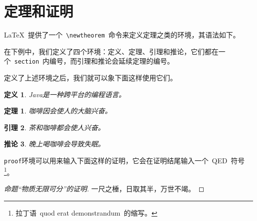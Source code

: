 \section{定理和证明}
\LaTeX~提供了一个~\verb|\newtheorem|~命令来定义定理之类的环境，其语法如下。
\begin{code}
\newtheorem{环境名}[编号延续]{显示名}[编号层次]
\end{code}

在下例中，我们定义了四个环境：定义、定理、引理和推论，它们都在一个~\verb|section|~内编号，而引理和推论会延续定理的编号。
\begin{code}
\newtheorem{defination}{定义}[section]
\newtheorem{theorem}{定理}[section]
\newtheorem{lemma}[theorem]{引理}
\newtheorem{corollary}[theorem]{推论}
\end{code}

\newtheorem{defination}{定义}[section]
\newtheorem{theorem}{定理}[section]
\newtheorem{lemma}[theorem]{引理}
\newtheorem{corollary}[theorem]{推论}

定义了上述环境之后，我们就可以象下面这样使用它们。
\begin{demo}
\begin{defination}
Java是一种跨平台的编程语言。
\end{defination}
\end{demo}

\begin{demo}
\begin{theorem}
咖啡因会使人的大脑兴奋。
\end{theorem}
\end{demo}

\begin{demo}
\begin{lemma}
茶和咖啡都会使人兴奋。
\end{lemma}
\end{demo}

\begin{demo}
\begin{corollary}
晚上喝咖啡会导致失眠。
\end{corollary}
\end{demo}

\verb|proof|环境可以用来输入下面这样的证明，它会在证明结尾输入一个~QED~符号\footnote{拉丁语~quod erat demonstrandum~的缩写。}。

\begin{demo}
\begin{proof}[命题``物质无限可分''的证明]
一尺之棰，日取其半，万世不竭。
\end{proof}
\end{demo}

